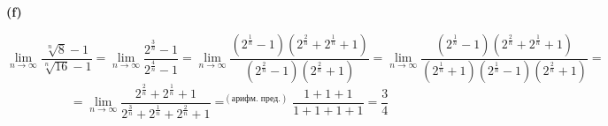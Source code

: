 \documentclass{article}
\begin{document}
\textsf{\textbf{(f)}}
\begin{center}
\[
\lim\limits_{n \to \infty} \frac{\sqrt[n]{8} - 1}{\sqrt[n]{16} - 1} = \lim\limits_{n \to \infty} \frac{2^{\frac{3}{n}} - 1}{2^{\frac{4}{n}} - 1} = \lim\limits_{n \to \infty} \frac{(2^{\frac{1}{n}} - 1)(2^{\frac{2}{n}} + 2^{\frac{1}{n}} + 1)}{(2^{\frac{2}{n}} - 1)(2^{\frac{2}{n}} + 1)} = \lim\limits_{n \to \infty} \frac{(2^{\frac{1}{n}} - 1)(2^{\frac{2}{n}} + 2^{\frac{1}{n}} + 1)}{(2^{\frac{1}{n}} + 1)(2^{\frac{1}{n}} - 1)(2^{\frac{2}{n}} + 1)} = 
\]    
\[
= \lim\limits_{n \to \infty} \frac{2^{\frac{2}{n}} + 2^{\frac{1}{n}} + 1}{2^{\frac{3}{n}} + 2^{\frac{1}{n}} + 2^{\frac{2}{n}} + 1} =^{(\text{арифм. пред.})}
\frac{1 + 1 + 1}{1 + 1 + 1 + 1} = \boxed{\frac{3}{4}}
\]

\end{center}
\end{document}
